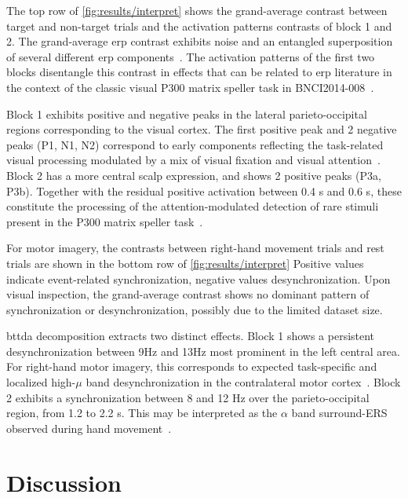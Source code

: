 \documentclass[twocolumn]{article}
\begin{document}
The top row of \cref{fig:results/interpret} shows the grand-average contrast
between target and non-target trials and the activation patterns contrasts of
block 1 and 2.
The grand-average \ac{erp} contrast exhibits noise and an entangled superposition
of several different \ac{erp} components~\cite{Luck2011}.
The activation patterns of the first two blocks disentangle this contrast
in effects that can be related to \ac{erp} literature in the context of the
classic visual P300 matrix speller task in BNCI2014-008~\cite{Riccio2013}.

Block 1 exhibits positive and negative peaks in the lateral parieto-occipital
regions corresponding to the visual cortex.
The first positive peak and 2 negative peaks (P1, N1, N2)
correspond to early components reflecting the task-related visual processing
modulated by a mix of visual fixation and visual attention~\cite{Treder2010}.
Block 2 has a more central scalp expression, and shows 2 positive peaks (P3a, P3b).
Together with the residual positive activation between 0.4 s and 0.6 s, these
constitute the processing of the attention-modulated detection of rare stimuli
present in the P300 matrix speller task~\cite{Kamp2013}.

For motor imagery, the contrasts between right-hand movement trials and rest trials
are shown in the bottom row of \cref{fig:results/interpret}
Positive values indicate event-related synchronization, negative values
desynchronization.
Upon visual inspection, the grand-average contrast shows no dominant pattern of
synchronization or desynchronization, possibly due to the limited dataset size.

\Ac{bttda} decomposition extracts two distinct effects.
Block 1 shows a persistent desynchronization between 9Hz and 13Hz most prominent
in the left central area.
For right-hand motor imagery, this corresponds to expected task-specific and
localized high-$\mu$ band desynchronization in the contralateral motor
cortex~\cite{Pfurtscheller2000,Wolpaw2012}.
Block 2 exhibits a synchronization between 8 and 12 Hz over the
parieto-occipital region, from 1.2 to 2.2 s.
This may be interpreted as the $\alpha$ band surround-ERS observed during hand
movement~\cite{Suffczynski1999, Gerloff1998,Wolpaw2012}.




\section{Discussion}
\end{document}
